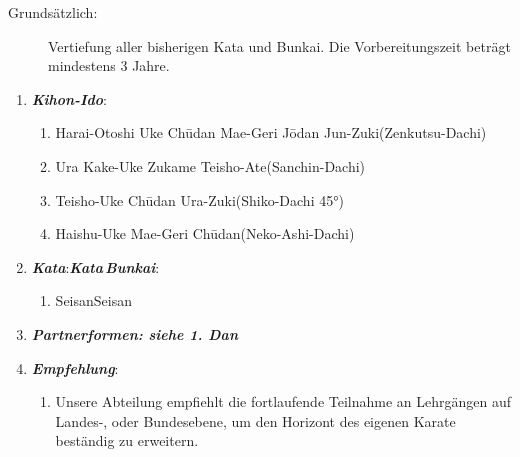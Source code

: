 \documentclass[a5paper,landscape,DIV=calc,11pt,notitlepage]{scrartcl}
\newcommand{\bull}{\,\textbullet\,}
\begin{document}
\begin{tcolorbox}[colback=white,colframe=black,coltitle=white,title=3. Dan: Schwarz - Yudansha\textit{ - \frqq Der technische Dan\flqq}]
	{\footnotesize 	\begin{description}
			\item[Grundsätzlich:]Vertiefung aller bisherigen Kata und Bunkai. Die Vorbereitungszeit beträgt mindestens 3 Jahre.\end{description}}
	\begin{enumerate}[nosep]
		\item \textit{\textbf{Kihon-Ido}}:
		\begin{enumerate}[nosep]
			\item Harai-Otoshi	Uke\bull Ch\={u}dan Mae-Geri\bull J\={o}dan Jun-Zuki\tabto{335pt}(Zenkutsu-Dachi)
			\item Ura Kake-Uke\bull Zukame\bull Teisho-Ate\tabto{335pt}(Sanchin-Dachi)
			\item Teisho-Uke\bull Ch\={u}dan Ura-Zuki\tabto{335pt}(Shiko-Dachi 45°)
			\item Haishu-Uke\bull Mae-Geri Ch\={u}dan\tabto{335pt}(Neko-Ashi-Dachi)
		\end{enumerate}
		\vspace{12pt}
		\item \textit{\textbf{Kata}}:\tabto{200pt}\textit{\textbf{Kata\,Bunkai}}:
		\begin{enumerate}[nosep]
			\item Seisan\tabto{200pt}Seisan
		\end{enumerate}
		\vspace{12pt}
		\item \textit{\textbf{Partnerformen: siehe 1. Dan}}
		\vspace{12pt}
		\item \textit{\textbf{Empfehlung}}:
		\begin{enumerate}[nosep]
			\item[] Unsere Abteilung empfiehlt die fortlaufende Teilnahme an Lehrgängen auf Landes-, oder Bundesebene, um den Horizont des eigenen Karate beständig zu erweitern.
		\end{enumerate}
	\end{enumerate}
\end{tcolorbox}
\end{document}
